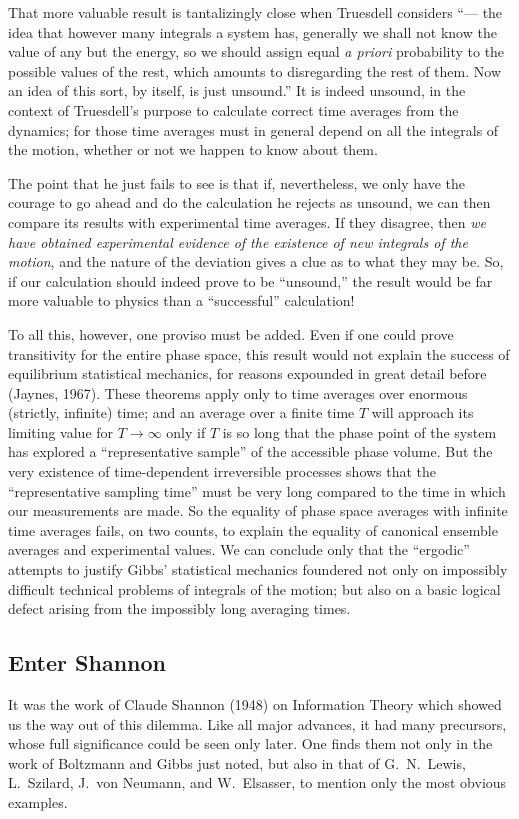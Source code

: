 That more valuable result is tantalizingly close when Truesdell considers ``--- the idea that however many integrals a system has, generally we shall not know the value of any but the energy, so we should assign equal \emph{a priori} probability to the possible values of the rest, which amounts to disregarding the rest of them. Now an idea of this sort, by itself, is just unsound.''
It is indeed unsound, in the context of Truesdell's purpose to calculate correct time averages from the dynamics; for those time averages must in general depend on all the integrals of the motion, whether or not we happen to know about them.

The point that he just fails to see is that if, nevertheless, we only have the courage to go ahead and do the calculation he rejects as unsound, we can then compare its results with experimental time averages.
If they disagree, then \emph{we have obtained experimental evidence of the existence of new integrals of the motion}, and the nature of the deviation gives a clue as to what they may be.
So, if our calculation should indeed prove to be ``unsound,'' the result would be far more valuable to physics than a ``successful'' calculation!

To all this, however, one proviso must be added.
Even if one could prove transitivity for the entire phase space, this result would not explain the success of equilibrium statistical mechanics, for reasons expounded in great detail before (Jaynes, \cite{jaynes67}{1967}).
These theorems apply only to time averages over enormous (strictly, infinite) time; and an average over a finite time $T$ will approach its limiting value for $T\to\infty$ only if $T$ is so long that the phase point of the system has explored a ``representative sample'' of the accessible phase volume.
But the very existence of time-dependent irreversible processes shows that the ``representative sampling time'' must be very long compared to the time in which our measurements are made.
So the equality of phase space averages with infinite time averages fails, on two counts, to explain the equality of canonical ensemble averages and experimental values.
We can conclude only that the ``ergodic'' attempts to justify Gibbs' statistical mechanics foundered not only on impossibly difficult technical problems of integrals of the motion; but also on a basic logical defect arising from the impossibly long averaging times.

\subsection*{Enter Shannon}
It was the work of Claude Shannon (\cite{shannon}{1948}) on Information Theory which showed us the way out of this dilemma.
Like all major advances, it had many precursors, whose full significance could be seen only later.
One finds them not only in the work of Boltzmann and Gibbs just noted, but also in that of G.~N.~Lewis, L.~Szilard, J.~von Neumann, and W.~Elsasser, to mention only the most obvious examples.

